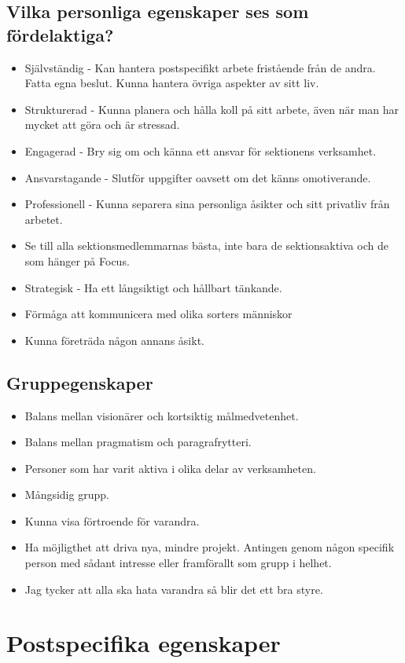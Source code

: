 \documentclass[a4paper]{article}
\begin{document}
\subsection*{Vilka personliga egenskaper ses som fördelaktiga?}
\begin{itemize}
\item Självständig - Kan hantera postspecifikt arbete fristående från de andra. Fatta egna beslut. Kunna hantera övriga aspekter av sitt liv.
\item Strukturerad - Kunna planera och hålla koll på sitt arbete, även när man har mycket att göra och är stressad.
\item Engagerad - Bry sig om och känna ett ansvar för sektionens verksamhet.
\item Ansvarstagande - Slutför uppgifter oavsett om det känns omotiverande.
\item Professionell - Kunna separera sina personliga åsikter och sitt privatliv från arbetet.
\item Se till alla sektionsmedlemmarnas bästa, inte bara de sektionsaktiva och de som hänger på Focus.
\item Strategisk - Ha ett långsiktigt och hållbart tänkande.
\item Förmåga att kommunicera med olika sorters människor
\item Kunna företräda någon annans åsikt.
\end{itemize}
\subsection*{Gruppegenskaper}
\begin{itemize}
\item Balans mellan visionärer och kortsiktig målmedvetenhet.
\item Balans mellan pragmatism och paragrafrytteri.
\item Personer som har varit aktiva i olika delar av verksamheten.
\item Mångsidig grupp.
\item Kunna visa förtroende för varandra.
\item Ha möjligthet att driva nya, mindre projekt. Antingen genom någon specifik person med sådant intresse eller framförallt som grupp i helhet.
\item Jag tycker att alla ska hata varandra så blir det ett bra styre.
\end{itemize}

\section*{Postspecifika egenskaper}
\end{document}
